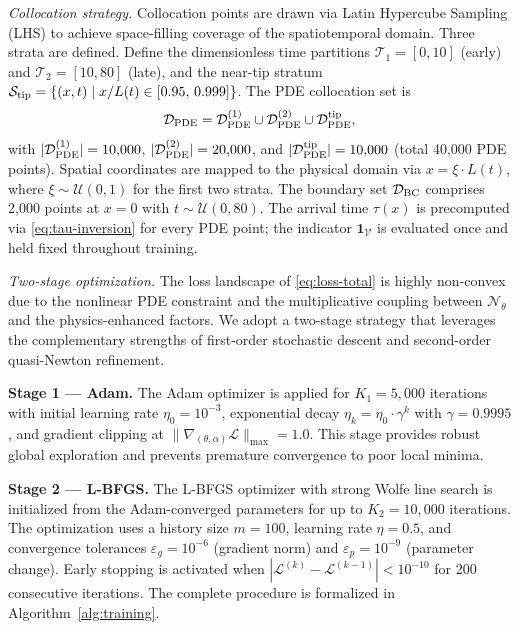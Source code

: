 \documentclass[a4paper,fleqn]{cas-sc}
\begin{document}
\medskip
\noindent\textit{Collocation strategy.}
Collocation points are drawn via Latin Hypercube Sampling (LHS) to
achieve space-filling coverage of the spatiotemporal domain. Three
strata are defined. Define the dimensionless time partitions
$\mathcal{T}_1 = [0, 10]$ (early) and $\mathcal{T}_2 = [10, 80]$
(late), and the near-tip stratum
$\mathcal{S}_{\rm tip} = \{(x,t) \mid x/L(t) \in [0.95,\,0.999]\}$.
The PDE collocation set is
\begin{equation}
  \mathcal{D}_{\rm PDE}
  = \mathcal{D}_{\rm PDE}^{(1)} \cup
    \mathcal{D}_{\rm PDE}^{(2)} \cup
    \mathcal{D}_{\rm PDE}^{\rm tip},
\end{equation}
with $|\mathcal{D}_{\rm PDE}^{(1)}| = 10{,}000$,
$|\mathcal{D}_{\rm PDE}^{(2)}| = 20{,}000$, and
$|\mathcal{D}_{\rm PDE}^{\rm tip}| = 10{,}000$ (total 40{,}000 PDE
points). Spatial coordinates are mapped to the physical domain via
$x = \xi \cdot L(t)$, where $\xi \sim \mathcal{U}(0,1)$ for the
first two strata. The boundary set $\mathcal{D}_{\rm BC}$ comprises
2{,}000 points at $x = 0$ with $t \sim \mathcal{U}(0, 80)$. The
arrival time $\tau(x)$ is precomputed via \eqref{eq:tau-inversion}
for every PDE point; the indicator $\mathbf{1}_{\mathcal{V}}$ is
evaluated once and held fixed throughout training.

\medskip
\noindent\textit{Two-stage optimization.}
The loss landscape of \eqref{eq:loss-total} is highly non-convex
due to the nonlinear PDE constraint and the multiplicative coupling
between $\mathcal{N}_{\theta}$ and the physics-enhanced factors. We
adopt a two-stage strategy that leverages the complementary
strengths of first-order stochastic descent and second-order
quasi-Newton refinement.

\textbf{Stage 1 --- Adam.}
The Adam optimizer \cite{Kingma2015} is applied for
$K_1 = 5{,}000$ iterations with initial learning rate
$\eta_0 = 10^{-3}$, exponential decay
$\eta_k = \eta_0 \cdot \gamma^{k}$ with $\gamma = 0.9995$, and
gradient clipping at $\|\nabla_{(\theta,\alpha)}\mathcal{L}\|_{\max}
= 1.0$. This stage provides robust global exploration and prevents
premature convergence to poor local minima.

\textbf{Stage 2 --- L-BFGS.}
The L-BFGS optimizer \cite{Liu1989} with strong Wolfe line search
is initialized from the Adam-converged parameters for up to
$K_2 = 10{,}000$ iterations. The optimization uses a history size
$m = 100$, learning rate $\eta = 0.5$, and convergence tolerances
$\varepsilon_g = 10^{-6}$ (gradient norm) and
$\varepsilon_p = 10^{-9}$ (parameter change). Early stopping is
activated when
$|\mathcal{L}^{(k)} - \mathcal{L}^{(k-1)}| < 10^{-10}$ for 200
consecutive iterations. The complete procedure is formalized in
Algorithm~\ref{alg:training}.
\end{document}
